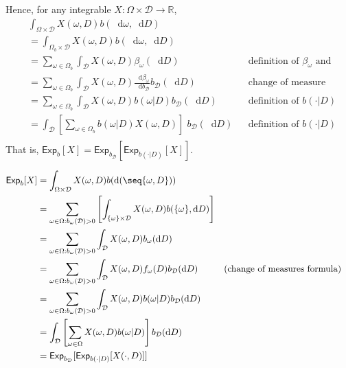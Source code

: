 \documentclass[a4paper]{article}
\newcommand\Exp{\mathsf{Exp}}
\newcommand{\D}{\mathcal{D}}
\newcommand{\Decs}{\mathcal{D}}
\renewcommand{\Re}{\mathbb{R}}
\renewcommand{\color}[1]{}
\newenvironment{colored}[1]{\leavevmode\color{#1}}{}
\newcommand\SetDelimiter[1][]{
	\nonscript\,#1\vert \allowbreak \nonscript\,\mathopen{}}
\providecommand\given{\SetDelimiter}
\newcommand*\diff{\mathop{}\!\mathrm{d}}
\newenvironment{CCM rewritten}
{\begingroup\color{blue}} %
{\endgroup}              %
\begin{document}
\begin{colored}{violet}
\begin{colored}{red}
	Hence, for any integrable $X:\Omega\times\Decs\to\Re$, 
\begin{align}
	&\int_{\Omega\times \Decs} X(\omega,D) b(\diff \omega, \diff D)\\
	&=\int_{\Omega_b\times \Decs} X(\omega,D) b(\diff \omega, \diff D)\\
	&=\sum_{\omega\in\Omega_b} \int_\Decs X(\omega,D)\beta_\omega(\diff D)&&\text{definition of $\beta_\omega$ and}\\
	&=\sum_{\omega\in\Omega_b} \int_\Decs X(\omega,D)\frac{\diff \beta_\omega}{\diff b_\Decs}b_\Decs(\diff D)&&\text{change of measure}\\
	&=\sum_{\omega\in\Omega_b} \int_\Decs X(\omega,D)b(\omega|D)b_\Decs(\diff D)&&\text{definition of $b(\cdot|D)$}\\
	&=\int_\Decs \left[\sum_{\omega\in\Omega_b} b(\omega|D)X(\omega,D)\right]\;b_\Decs(\diff D)&&\text{definition of $b(\cdot|D)$}\\
\end{align}
That is, $\Exp_b[X]=\Exp_{b_\Decs}[\Exp_{b(\cdot|D)}[X]]$.


\begin{align}
	\Exp_b[X]&=\int_{\Omega\times\Decs} X(\omega, D) b(\diff (\seq{\omega,D}))\\
		&=\sum_{\omega\in\Omega:b_\omega(\Decs)>0}\left[\int_{\{\omega\}\times \D} X(\omega,D) {b(\{\omega\},\diff D)}\right]\\
	&=\sum_{\omega\in\Omega:b_\omega(\Decs)>0}\int_\D X(\omega,D) b_\omega (\diff D)\\
	&=\sum_{\omega\in\Omega:b_\omega(\Decs)>0}\int_\D X(\omega,D) f_\omega(D) b_\D(\diff D)&&\text{(change of measures formula)}\\
	&=\sum_{\omega\in\Omega:b_\omega(\Decs)>0}\int_\D X(\omega,D) b(\omega |D) b_\D(\diff D)\\
		&=\int_\D \left[\sum_{\omega\in\Omega} X(\omega,D) b(\omega |D)\right] b_\D(\diff D)\\
		&=\Exp_{b_\D}[\Exp_{b(\cdot|D)}[X(\cdot,D)]]
\end{align}


%
%
%
%
%
%
%
\end{colored}

\end{colored}
\end{document}

